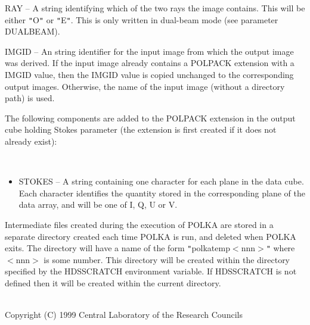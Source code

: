 \documentclass[twoside,11pt]{article}
\renewcommand{\_}{\texttt{\symbol{95}}}
\newcommand{\sstdiytopic}[2]{\item[{\hspace{-0.35em}#1\hspace{-0.35em}:}]
\mbox{} \\[1.3ex] #2}
\newcommand{\sstitemlist}[1]{
  \mbox{} \\
  \vspace{-3.5ex}
  \begin{itemize}
     #1
  \end{itemize}
}
\newcommand{\sstitem}{\item}
\newcommand{\sstdiytopic}[2]{\item[{#1}] #2 }
\newcommand{\sstitemlist}[1]{
      \begin{itemize}
         #1
      \end{itemize}
      \\
   }
\newcommand{\sstitem}{\item}
\begin{document}
{{{{            \sstitem
              RAY -- A string identifying which of the two rays the image
              contains. This will be either {\tt "}O{\tt "} or {\tt "}E{\tt "}. This is only written in
              dual-beam mode (see parameter DUALBEAM).
   
            \sstitem
              IMGID -- An string identifier for the input image from which the
              output image was derived. If the input image already contains a
              POLPACK extension with a IMGID value, then the IMGID value is copied
              unchanged to the corresponding output images. Otherwise, the name of
              the input image (without a directory path) is used.
         }

         \sstitem
         The following components are added to the POLPACK extension in the
         output cube holding Stokes parameter (the extension is first created
         if it does not already exist):

         \sstitemlist{

            \sstitem
              STOKES -- A string containing one character for each plane in
              the data cube. Each character identifies the quantity
              stored in the corresponding plane of the data array, and will be one
              of I, Q, U or V.
         }

         \sstitem
         Intermediate files created during the execution of POLKA are stored
         in a separate directory created each time POLKA is run, and deleted
         when POLKA exits. The directory will have a name of the form
         {\tt "}polka\_temp\_$<$nnn$>${\tt "} where $<$nnn$>$ is some number. This directory will be
         created within the directory specified by the HDS\_SCRATCH environment
         variable. If HDS\_SCRATCH is not defined then it will be created within
         the current directory.
      }
   }
   \sstdiytopic{
      Copyright
   }{
      Copyright (C) 1999 Central Laboratory of the Research Councils
   }
}
\newpage
\end{document}
